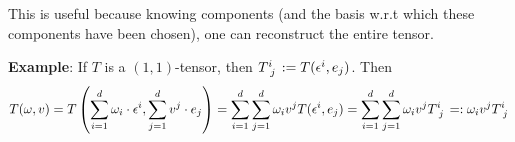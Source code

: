 This is useful because knowing components (and the basis w.r.t which these components have been chosen), one can reconstruct the entire tensor.

\textbf{Example}: If $T$ is a $(1,1)$-tensor, then $T\indices{^{i}_{j}} := T(\epsilon^i,e_j)$. Then\\
\begin{equation*}
T(\omega,v) = T\left(\sum_{i=1}^d \omega_i \cdot \epsilon^i,\sum_{j=1}^d v^j \cdot e_j \right) = \sum_{i=1}^d \sum_{j=1}^d \omega_i v^j T(\epsilon^i,e_j) = \sum_{i=1}^d \sum_{j=1}^d \omega_i v^j T\indices{^{i}_{j}} =: \omega_i v^j T\indices{^{i}_{j}}
\end{equation*}